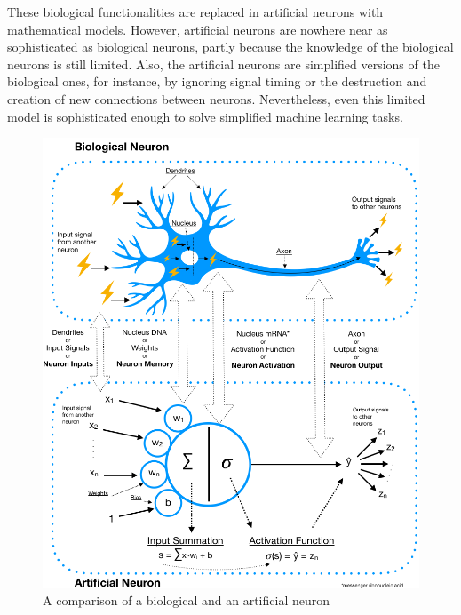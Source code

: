 These biological functionalities are replaced in artificial neurons with mathematical models. However, artificial neurons are nowhere near as sophisticated as biological neurons, partly because the knowledge of the biological neurons is still limited. Also, the artificial neurons are simplified versions of the biological ones, for instance, by ignoring signal timing or the destruction and creation of new connections between neurons. Nevertheless, even this limited model is sophisticated enough to solve simplified machine learning tasks.

\begin{figure}[h]
    \centering
    \includegraphics[width=\textwidth,height=\textheight,keepaspectratio]{biological_and_artificial_neuron}
    \caption{A comparison of a biological and an artificial neuron}
    \label{fig:biological_and_artificial_neuron}
\end{figure}


